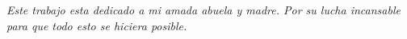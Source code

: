 
\begin{dedication} %

\textit{Este trabajo esta dedicado a mi amada abuela y madre. Por su lucha incansable para que todo esto se hiciera posible.}

\end{dedication}

